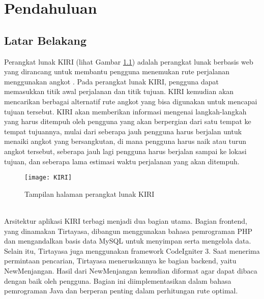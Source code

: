 \chapter{Pendahuluan}
\label{chap:intro}
   
\section{Latar Belakang}
\label{sec:label}

Perangkat lunak KIRI (lihat Gambar \ref{fig:kiri}) adalah perangkat lunak berbasis web yang dirancang untuk membantu pengguna menemukan rute perjalanan menggunakan angkot . Pada perangkat lunak KIRI, pengguna dapat memasukkan titik awal perjalanan dan titik tujuan. KIRI kemudian akan mencarikan berbagai alternatif rute angkot yang bisa digunakan untuk mencapai tujuan tersebut. KIRI akan memberikan informasi mengenai langkah-langkah yang harus ditempuh oleh pengguna yang akan berpergian dari satu tempat ke tempat tujuannya, mulai dari seberapa jauh pengguna harus berjalan untuk menaiki angkot yang bersangkutan, di mana pengguna harus naik atau turun angkot tersebut, seberapa jauh lagi pengguna harus berjalan sampai ke lokasi tujuan, dan seberapa lama estimasi waktu perjalanan yang akan ditempuh.
\begin{figure}[h] 
	\centering  
	\texttt{[image: KIRI]}  
	\caption{Tampilan halaman perangkat lunak KIRI}
	\label{fig:kiri} 
\end{figure}
\\	
Arsitektur aplikasi KIRI terbagi menjadi dua bagian utama. Bagian frontend, yang dinamakan Tirtayasa, dibangun menggunakan bahasa pemrograman PHP dan mengandalkan basis data MySQL untuk menyimpan serta mengelola data. Selain itu, Tirtayasa juga menggunakan framework CodeIgniter 3. Saat menerima permintaan pencarian, Tirtayasa meneruskannya ke bagian backend, yaitu NewMenjangan. Hasil dari NewMenjangan kemudian diformat agar dapat dibaca dengan baik oleh pengguna. Bagian ini diimplementasikan dalam bahasa pemrograman Java dan berperan penting dalam perhitungan rute optimal.
\\
